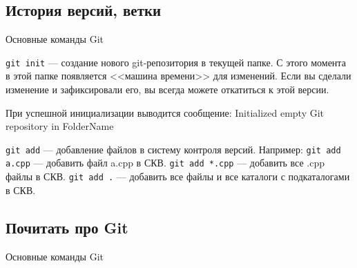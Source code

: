  
\subsection{История версий, ветки}
\begin{frame}[t]{Основные команды Git}

\texttt{git init} --- создание нового git-репозитория в текущей папке.
С этого момента в этой папке появляется <<машина времени>> для изменений.
Если вы сделали изменение и зафиксировали его, вы всегда можете откатиться к этой версии.

При успешной инициализации выводится сообщение:
Initialized empty Git repository in FolderName

\texttt{git add} --- добавление файлов в систему контроля версий.
Например: \texttt{git add a.cpp} --- добавить файл a.cpp в СКВ.
\texttt{git add *.cpp} --- добавить все .cpp файлы в СКВ. 
\texttt{git add .} --- добавить все файлы и все каталоги с подкаталогами в СКВ. 

\end{frame}

\subsection{Почитать про Git}
\begin{frame}[t]{Основные команды Git}

\end{frame}
                                         